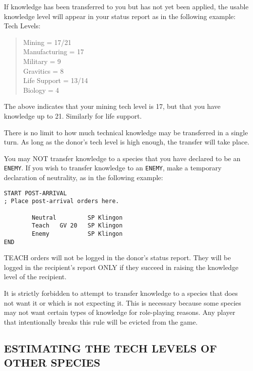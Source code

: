 \documentclass[10pt,titlepage]{article}
\begin{document}
If knowledge has been transferred to you but has not yet been applied, the
usable knowledge level will appear in your status report as in the following
example: \\

\noindent Tech Levels:
\begin{quotation}
   \noindent Mining = 17/21 \\
   Manufacturing = 17 \\
   Military = 9 \\
   Gravitics = 8 \\
   Life Support = 13/14  \\
   Biology = 4 \\
\end{quotation} 

The above indicates that your mining tech level is 17, but that you have
knowledge up to 21.  Similarly for life support.

There is no limit to how much technical knowledge may be transferred in a
single turn.  As long as the donor's tech level is high enough, the transfer
will take place.

You may NOT transfer knowledge to a species that you have declared to be
an \texttt{ENEMY}.  If you wish to transfer knowledge to an \texttt{ENEMY}, make a temporary
declaration of neutrality, as in the following example:

\begin{verbatim}
START POST-ARRIVAL
; Place post-arrival orders here.

        Neutral         SP Klingon
        Teach   GV 20   SP Klingon
        Enemy           SP Klingon
END\end{verbatim} 


TEACH orders will not be logged in the donor's status report.  They will be
logged in the recipient's report ONLY if they succeed in raising the knowledge
level of the recipient.


\begin{importantnote}
	It is strictly forbidden to attempt to transfer knowledge to
	a species that does not want it or which is not expecting it.
	This is necessary because some species may not want certain
	types of knowledge for role-playing reasons.  Any player that
	intentionally breaks this rule will be evicted from the game.
\end{importantnote}

\subsection{ESTIMATING THE TECH LEVELS OF OTHER SPECIES}
\label{sec:estimatetechlevels}
\end{document}

